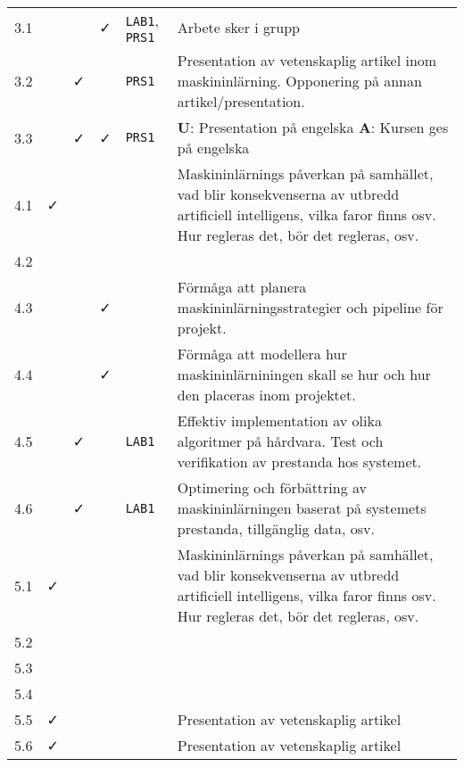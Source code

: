 \begin{sidewaystable}[H]
{\begin{tabular}{cccclp{20cm}}
\midrule
3.1 &   &   & \faCheck & \texttt{LAB1}, \texttt{PRS1}       & Arbete sker i grupp \tabularnewline
3.2 &   & \faCheck &   & \texttt{PRS1}             & Presentation av vetenskaplig artikel inom maskininlärning. Opponering på annan artikel/presentation. \tabularnewline
3.3 &   & \faCheck & \faCheck & \texttt{PRS1}             & \textbf{U}: Presentation på engelska \textbf{A}: Kursen ges på engelska \tabularnewline
4.1 & \faCheck &   &   &                  & Maskininlärnings påverkan på samhället, vad blir konsekvenserna av utbredd artificiell intelligens, vilka faror finns osv. Hur regleras det, bör det regleras, osv. \tabularnewline
4.2 &   &   &   &                  & \tabularnewline
4.3 &   &   & \faCheck &                  & Förmåga att planera maskininlärningsstrategier och pipeline för projekt. \tabularnewline
4.4 &   &   & \faCheck &                  & Förmåga att modellera hur maskininlärniningen skall se hur och hur den placeras inom projektet. \tabularnewline
4.5 &   & \faCheck &   & \texttt{LAB1}             & Effektiv implementation av olika algoritmer på hårdvara. Test och verifikation av  prestanda hos systemet. \tabularnewline
4.6 &   & \faCheck &   & \texttt{LAB1}             & Optimering och förbättring av maskininlärningen baserat på systemets prestanda, tillgänglig data, osv. \tabularnewline
\midrule
5.1 & \faCheck &   &   &                  & Maskininlärnings påverkan på samhället, vad blir konsekvenserna av utbredd artificiell intelligens, vilka faror finns osv. Hur regleras det, bör det regleras, osv. \tabularnewline
5.2 &   &   &   &                  & \tabularnewline
5.3 &   &   &   &                  & \tabularnewline
5.4 &   &   &   &                  & \tabularnewline
5.5 & \faCheck &   &   &                  & Presentation av vetenskaplig artikel\tabularnewline
5.6 & \faCheck &   &   &                  & Presentation av vetenskaplig artikel\tabularnewline
\bottomrule
\end{tabular}
}
\end{sidewaystable}